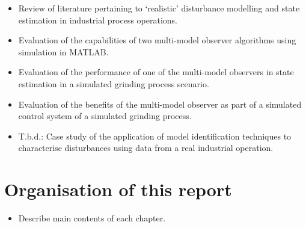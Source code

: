 \begin{itemize}
	\item Review of literature pertaining to `realistic' disturbance modelling and state estimation in industrial process operations.
	\item Evaluation of the capabilities of two multi-model observer algorithms using simulation in MATLAB.
	\item Evaluation of the performance of one of the multi-model observers in state estimation in a simulated grinding process scenario.
	\item Evaluation of the benefits of the multi-model observer as part of a simulated control system of a simulated grinding process.
	\item T.b.d.: Case study of the application of model identification techniques to characterise disturbances using data from a real industrial operation.
\end{itemize}


\section*{Organisation of this report}

\begin{itemize}
	\item Describe main contents of each chapter.
\end{itemize}
